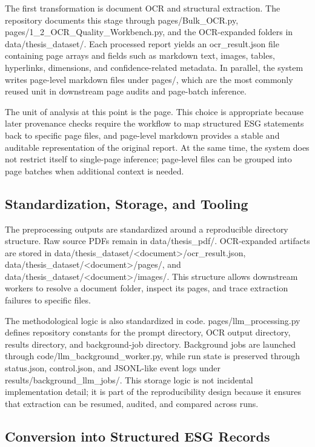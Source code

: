 The first transformation is document OCR and structural extraction. The repository documents this stage through pages/Bulk\_OCR.py, pages/1\_2\_OCR\_Quality\_Workbench.py, and the OCR-expanded folders in data/thesis\_dataset/. Each processed report yields an ocr\_result.json file containing page arrays and fields such as markdown text, images, tables, hyperlinks, dimensions, and confidence-related metadata. In parallel, the system writes page-level markdown files under pages/, which are the most commonly reused unit in downstream page audits and page-batch inference.

The unit of analysis at this point is the page. This choice is appropriate because later provenance checks require the workflow to map structured ESG statements back to specific page files, and page-level markdown provides a stable and auditable representation of the original report. At the same time, the system does not restrict itself to single-page inference; page-level files can be grouped into page batches when additional context is needed.

\subsection{Standardization, Storage, and Tooling}

The preprocessing outputs are standardized around a reproducible directory structure. Raw source PDFs remain in data/thesis\_pdf/. OCR-expanded artifacts are stored in data/thesis\_dataset/<document>/ocr\_result.json, data/thesis\_dataset/<document>/pages/, and data/thesis\_dataset/<document>/images/. This structure allows downstream workers to resolve a document folder, inspect its pages, and trace extraction failures to specific files.

The methodological logic is also standardized in code. pages/llm\_processing.py defines repository constants for the prompt directory, OCR output directory, results directory, and background-job directory. Background jobs are launched through code/llm\_background\_worker.py, while run state is preserved through status.json, control.json, and JSONL-like event logs under results/background\_llm\_jobs/. This storage logic is not incidental implementation detail; it is part of the reproducibility design because it ensures that extraction can be resumed, audited, and compared across runs.

\subsection{Conversion into Structured ESG Records}

